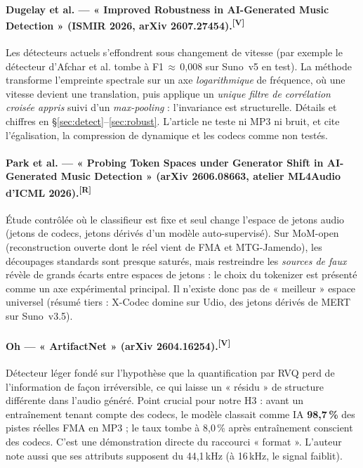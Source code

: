 \documentclass[10pt,a4paper]{article}
\newcommand{\sV}{\textsuperscript{\scriptsize\textcolor{green!40!black}{[V]}}}
\newcommand{\sR}{\textsuperscript{\scriptsize\textcolor{orange!80!black}{[R]}}}
\begin{document}
\paragraph{Dugelay et al. --- « Improved Robustness in AI-Generated Music Detection » (ISMIR 2026, arXiv 2607.27454).\sV}
Les détecteurs actuels s'effondrent sous changement de vitesse (par exemple le détecteur d'Afchar et al. tombe à F1\,$\approx$\,0,008 sur Suno~v5 en test). La méthode transforme l'empreinte spectrale sur un axe \emph{logarithmique} de fréquence, où une vitesse devient une translation, puis applique un \emph{unique filtre de corrélation croisée appris} suivi d'un \emph{max-pooling} : l'invariance est structurelle. Détails et chiffres en §\ref{sec:detect}--\ref{sec:robust}. L'article ne teste ni MP3 ni bruit, et cite l'égalisation, la compression de dynamique et les codecs comme non testés.

\paragraph{Park et al. --- « Probing Token Spaces under Generator Shift in AI-Generated Music Detection » (arXiv 2606.08663, atelier ML4Audio d'ICML 2026).\sR}
Étude contrôlée où le classifieur est fixe et seul change l'espace de jetons audio (jetons de codecs, jetons dérivés d'un modèle auto-supervisé). Sur MoM-open (reconstruction ouverte dont le réel vient de FMA et MTG-Jamendo), les découpages standards sont presque saturés, mais restreindre les \emph{sources de faux} révèle de grands écarts entre espaces de jetons : le choix du tokenizer est présenté comme un axe expérimental principal. Il n'existe donc pas de « meilleur » espace universel (résumé tiers : X-Codec domine sur Udio, des jetons dérivés de MERT sur Suno~v3.5).

\paragraph{Oh --- « ArtifactNet » (arXiv 2604.16254).\sV}
Détecteur léger fondé sur l'hypothèse que la quantification par RVQ perd de l'information de façon irréversible, ce qui laisse un « résidu » de structure différente dans l'audio généré. Point crucial pour notre H3 : avant un entraînement tenant compte des codecs, le modèle classait comme IA \textbf{98,7\,\%} des pistes réelles FMA en MP3 ; le taux tombe à 8,0\,\% après entraînement conscient des codecs. C'est une démonstration directe du raccourci « format ». L'auteur note aussi que ses attributs supposent du 44,1\,kHz (à 16\,kHz, le signal faiblit).
\end{document}
